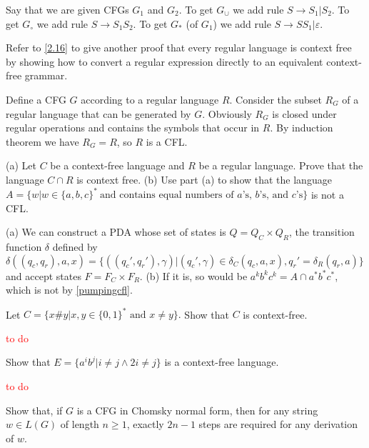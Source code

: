 Say that we are given CFGs $G_1$ and $G_2$. To get $G_{\cup}$ we add rule $S\to S_1|S_2$. To get $G_{\circ}$ we add rule $S\to S_1S_2$. To get $G_{*}$ (of $G_1$) we add rule $S\to SS_1|\varepsilon$.

\begin{exercise}
  Refer to \ref{2.16} to give another proof that every regular language is context free by showing how to convert a regular expression directly to an equivalent context-free grammar.
\end{exercise}

Define a CFG $G$ according to a regular language $R$. Consider the subset $R_G$ of a regular language that can be generated by $G$. Obviously $R_G$ is closed under regular operations and contains the symbols that occur in $R$. By induction theorem we have $R_G=R$, so $R$ is a CFL.

\begin{exercise}
  (a) Let $C$ be a context-free language and $R$ be a regular language. Prove that the language $C\cap R$ is context free. (b) Use part (a) to show that the language $A = \{w| w \in \{a, b, c\}^*\ \text{and contains equal numbers of $a$'s, $b$'s, and $c$'s}\}$ is not a CFL.
\end{exercise}

(a) We can construct a PDA whose set of states is $Q=Q_{C}\times Q_{R}$, the transition function $\delta$ defined by $\delta((q_c, q_r),a,x)=\{((q_c',q_r'),\gamma)|(q_c',\gamma)\in \delta_C(q_c,a,x),q_r'=\delta_R(q_r,a)\}$ and accept states $F=F_C\times F_R$. (b) If it is, so would be $a^kb^kc^k=A\cap a^*b^*c^*$, which is not by \ref{pumpingcfl}.

\setcounter{exercise}{21}

\begin{exercise}
  Let $C=\{x\#y|x,y\in\{0,1\}^*\text{ and }x\neq y\}.$ Show that $C$ is context-free.
\end{exercise}

\textcolor{red}{to do}

\setcounter{exercise}{23}

\begin{exercise}
  Show that $E=\{a^ib^j|i\neq j \wedge 2i\neq j\}$ is a context-free language.
\end{exercise}

\textcolor{red}{to do}

\setcounter{exercise}{25}

\begin{exercise}
  Show that, if $G$ is a CFG in Chomsky normal form, then for any string $w \in L(G)$ of length $n \geq 1$, exactly $2n - 1$ steps are required for any derivation of $w$.
\end{exercise}

